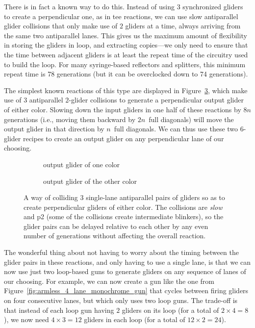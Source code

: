 There is in fact a known way to do this. Instead of using $3$ synchronized gliders to create a perpendicular one, as in tee reactions, we can use slow antiparallel glider collisions that only make use of $2$ gliders at a time, always arriving from the same two antiparallel lanes. This gives us the maximum amount of flexibility in storing the gliders in loop, and extracting copies---we only need to ensure that the time between adjacent gliders is at least the repeat time of the circuitry used to build the loop. For many syringe-based reflectors and splitters, this minimum repeat time is 78 generations (but it can be overclocked down to 74 generations).

The simplest known reactions of this type are displayed in Figure~\ref{fig:armless_tee}, which make use of $3$ antiparallel $2$-glider collisions to generate a perpendicular output glider of either color. Slowing down the input gliders in one half of these reactions by $8n$ generations (i.e., moving them backward by $2n$~full diagonals) will move the output glider in that direction by $n$~full diagonals. We can thus use these two $6$-glider recipes to create an output glider on any perpendicular lane of our choosing.

\begin{figure}[!htb]
	\centering
	\begin{subfigure}{0.485\textwidth}
		\centering
		\caption{output glider of one color}
		\label{fig:armless_tee_0}
	\end{subfigure} \hfill \begin{subfigure}{.485\textwidth}
		\centering
		\caption{output glider of the other color}
		\label{fig:armless_tee_1}
	\end{subfigure}
	\caption{A way of colliding $3$ single-lane antiparallel pairs of gliders so as to create perpendicular gliders of either color. The collisions are \emph{slow} and p2 (some of the collisions create intermediate blinkers), so the glider pairs can be delayed relative to each other by any even number of generations without affecting the overall reaction.}\label{fig:armless_tee}
\end{figure}

The wonderful thing about not having to worry about the timing between the glider pairs in these reactions, and only having to use a single lane, is that we can now use just two loop-based guns to generate gliders on any sequence of lanes of our choosing. For example, we can now create a gun like the one from Figure~\ref{fig:armless_4_lane_monochrome_gun} that cycles between firing gliders on four consecutive lanes, but which only uses two loop guns. The trade-off is that instead of each loop gun having $2$ gliders on its loop (for a total of $2 \times 4 = 8$), we now need $4 \times 3 = 12$ gliders in each loop (for a total of $12 \times 2 = 24$).

